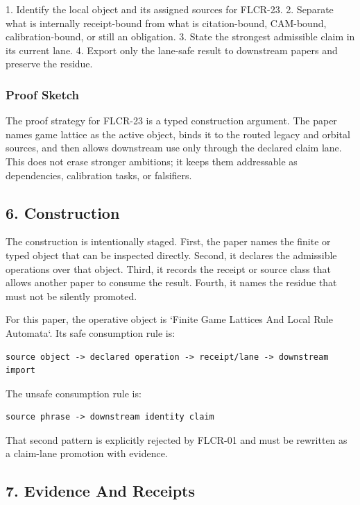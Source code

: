 \documentclass[11pt]{article}
\begin{document}
1. Identify the local object and its assigned sources for FLCR-23.
2. Separate what is internally receipt-bound from what is citation-bound, CAM-bound, calibration-bound, or still an obligation.
3. State the strongest admissible claim in its current lane.
4. Export only the lane-safe result to downstream papers and preserve the residue.

\subsubsection*{Proof Sketch}

The proof strategy for FLCR-23 is a typed construction argument. The paper names game lattice as the active object, binds it to the routed legacy and orbital sources, and then allows downstream use only through the declared claim lane. This does not erase stronger ambitions; it keeps them addressable as dependencies, calibration tasks, or falsifiers.

\subsection*{6. Construction}

The construction is intentionally staged. First, the paper names the finite or
typed object that can be inspected directly. Second, it declares the admissible
operations over that object. Third, it records the receipt or source class that
allows another paper to consume the result. Fourth, it names the residue that
must not be silently promoted.

For this paper, the operative object is `Finite Game Lattices And Local Rule Automata`. Its safe consumption
rule is:

\begin{verbatim}
source object -> declared operation -> receipt/lane -> downstream import
\end{verbatim}

The unsafe consumption rule is:

\begin{verbatim}
source phrase -> downstream identity claim
\end{verbatim}

That second pattern is explicitly rejected by FLCR-01 and must be rewritten as
a claim-lane promotion with evidence.

\subsection*{7. Evidence And Receipts}
\end{document}
